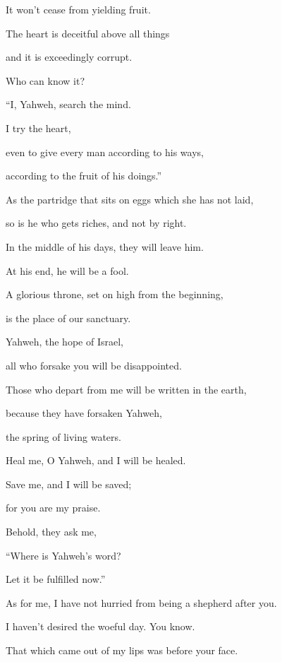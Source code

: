 {\par }{\QB It won’t cease from yielding fruit.
\par }{\Q {}The heart is deceitful above all things
\par }{\QB and it is exceedingly corrupt.
\par }{\QB Who can know it?
\par }{\BB \par }{\Q {}“I, Yahweh, search the mind.
\par }{\QB I try the heart,
\par }{\Q even to give every man according to his ways,
\par }{\QB according to the fruit of his doings.”
\par }{\BB \par }{\Q {}As the partridge that sits on eggs which she has not laid,
\par }{\QB so is he who gets riches, and not by right.
\par }{\Q In the middle of his days, they will leave him.
\par }{\QB At his end, he will be a fool.
\par }{\Q {}A glorious throne, set on high from the beginning,
\par }{\QB is the place of our sanctuary.
\par }{\Q {}Yahweh, the hope of Israel,
\par }{\QB all who forsake you will be disappointed.
\par }{\Q Those who depart from me will be written in the earth,
\par }{\QB because they have forsaken Yahweh,
\par }{\QB the spring of living waters.
\par }{\Q {}Heal me, O Yahweh, and I will be healed.
\par }{\QB Save me, and I will be saved;
\par }{\QB for you are my praise.
\par }{\Q {}Behold, they ask me,
\par }{\QB “Where is Yahweh’s word?
\par }{\QB Let it be fulfilled now.”
\par }{\Q {}As for me, I have not hurried from being a shepherd after you.
\par }{\QB I haven’t desired the woeful day. You know.
\par }{\QB That which came out of my lips was before your face.
}
